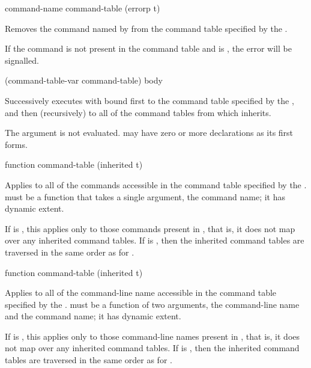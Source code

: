  {command-name command-table \key (errorp t)}

Removes the command named by  from the command table specified
by the  .

If the command is not present in the command table and  is
, the  error will be signalled.


  {(command-table-var command-table) \body body}

Successively executes  with  bound first to
the command table specified by the 
, and then (recursively) to all of the command tables from
which  inherits.

The  argument is not evaluated.   may have zero
or more declarations as its first forms. 

 {function command-table \key (inherited t)}

Applies  to all of the commands accessible in the command table
specified by the  .
 must be a function that takes a single argument, the command
name; it has dynamic extent.

If  is , this applies  only to
those commands present in , that is, it does not map over
any inherited command tables.  If  is , then the
inherited command tables are traversed in the same order as for
.

 {function command-table \key (inherited t)}

Applies  to all of the command-line name accessible in the
command table specified by the 
.   must be a function of two arguments,
the command-line name and the command name; it has dynamic extent.

If  is , this applies  only to
those command-line names present in , that is, it does
not map over any inherited command tables.  If  is
, then the inherited command tables are traversed in the same
order as for .


